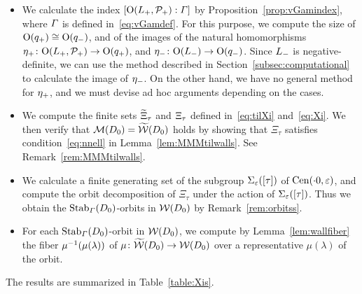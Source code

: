 \documentclass{amsart} %
\begin{document}
\begin{itemize}
\item 
We calculate the index $[\mathord{\mathrm{O}}(L_{+}, \mathord{\mathcal{P}}_{+}): \varGamma]$ 
by Proposition~\ref{prop:vGamindex},
where $\varGamma$ is defined in~\eqref{eq:vGamdef}.
 For this purpose, 
we compute the size of $\mathord{\mathrm{O}}(q_{+})\cong \mathord{\mathrm{O}}(q_{-})$, 
and of 
the images of the natural homomorphisms 
${\eta}_{+}\colon \mathord{\mathrm{O}}(L_{+}, \mathord{\mathcal{P}}_{+})\to \mathord{\mathrm{O}}(q_{+})$, 
and
${\eta}_{-}\colon \mathord{\mathrm{O}}(L_{-})\to \mathord{\mathrm{O}}(q_{-})$.
Since $L_{-}$ is negative-definite,
we can use the method described in Section~\ref{subsec:computational}
to calculate the image of ${\eta}_{-}$.
On the other hand, 
we have no general method for ${\eta}_{+}$, and we must devise ad hoc arguments depending on the cases.
\item 
We compute the finite sets $\widetilde{\Xi}_{\tau}$ and $\Xi_{\tau}$
defined in~\eqref{eq:tilXi} and~\eqref{eq:Xi}.
%
%
We then verify that $\mathord{\mathcal{M}}(D_0)=\widetilde{\mathord{\mathcal{W}}} (D_0)$ holds
by showing that $\Xi_{\tau}$ satisfies condition~\eqref{eq:nnell}
in Lemma~\ref{lem:MMMtilwalls}.
See Remark~\ref{rem:MMMtilwalls}.
\item 
We calculate a finite generating set of 
the subgroup $\Sigma_{\varepsilon}([\tau])$ of $\mathrm{Cen}(\cdot 0, \varepsilon)$,
and compute the orbit decomposition of $\Xi_{\tau}$ under the action of $\Sigma_{\varepsilon}([\tau])$.
Thus we obtain 
the $\operatorname{Stab}_{\varGamma}(D_0)$-orbits in $\mathord{\mathcal{W}}(D_0)$
by Remark~\ref{rem:orbitss}.
\item
For each $\operatorname{Stab}_{\varGamma}(D_0)$-orbit in $\mathord{\mathcal{W}}(D_0)$,
we compute by Lemma~\ref{lem:wallfiber} the fiber $\mu^{-1}(\mu(\lambda))$ of $\mu\colon \widetilde{\mathord{\mathcal{W}}}(D_0)\to \mathord{\mathcal{W}}(D_0)$
over a representative $\mu(\lambda)$ of the orbit.
\end{itemize}
%
The results are summarized in Table~\ref{table:Xis}.
%
%
\end{document}
